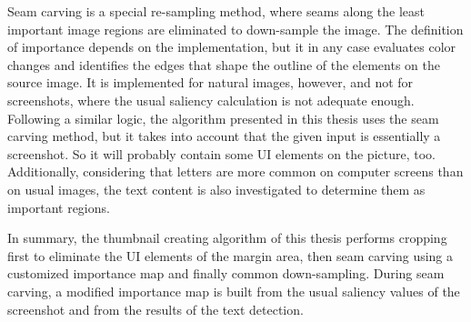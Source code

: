 \documentclass[draft,final]{vutinfth} %
\begin{document}
	Seam carving is a special re-sampling method, where seams along the least important image regions are eliminated to down-sample the image.
	The definition of importance depends on the implementation, but it in any case evaluates color changes and identifies the edges that shape the outline of the elements on the source image.
	It is implemented for natural images, however, and not for screenshots, where the usual saliency calculation is not adequate enough.
	Following a similar logic, the algorithm presented in this thesis uses the seam carving method, but it takes into account that the given input is essentially a screenshot.
	So it will probably contain some UI elements on the picture, too.
	Additionally, considering that letters are more common on computer screens than on usual images, the text content is also investigated to determine them as important regions.\par
	In summary, the thumbnail creating algorithm of this thesis performs cropping first to eliminate the UI elements of the margin area, then seam carving using a customized importance map and finally common down-sampling.
	During seam carving, a modified importance map is built from the usual saliency values of the screenshot and from the results of the text detection.
	
\end{document}
